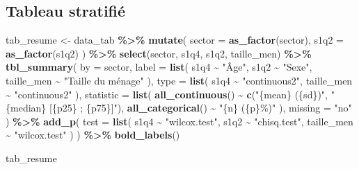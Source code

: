 \documentclass[
]{article}
\newenvironment{Shaded}{\begin{snugshade}}{\end{snugshade}}
\newcommand{\AttributeTok}[1]{\textcolor[rgb]{0.13,0.29,0.53}{#1}}
\newcommand{\FunctionTok}[1]{\textcolor[rgb]{0.13,0.29,0.53}{\textbf{#1}}}
\newcommand{\NormalTok}[1]{#1}
\newcommand{\OtherTok}[1]{\textcolor[rgb]{0.56,0.35,0.01}{#1}}
\newcommand{\SpecialCharTok}[1]{\textcolor[rgb]{0.81,0.36,0.00}{\textbf{#1}}}
\newcommand{\StringTok}[1]{\textcolor[rgb]{0.31,0.60,0.02}{#1}}
\begin{document}
\subsection{Tableau stratifié}\label{tableau-stratifiuxe9}

\begin{Shaded}
\begin{Highlighting}[]
\NormalTok{tab\_resume }\OtherTok{\textless{}{-}}\NormalTok{ data\_tab }\SpecialCharTok{\%\textgreater{}\%}
  \FunctionTok{mutate}\NormalTok{(}
    \AttributeTok{sector =} \FunctionTok{as\_factor}\NormalTok{(sector),}
    \AttributeTok{s1q2 =} \FunctionTok{as\_factor}\NormalTok{(s1q2)}
\NormalTok{  ) }\SpecialCharTok{\%\textgreater{}\%}
  \FunctionTok{select}\NormalTok{(sector, s1q4, s1q2, taille\_men) }\SpecialCharTok{\%\textgreater{}\%}
  \FunctionTok{tbl\_summary}\NormalTok{(}
    \AttributeTok{by =}\NormalTok{ sector,}
    \AttributeTok{label =} \FunctionTok{list}\NormalTok{(}
\NormalTok{      s1q4 }\SpecialCharTok{\textasciitilde{}} \StringTok{"Âge"}\NormalTok{,}
\NormalTok{      s1q2 }\SpecialCharTok{\textasciitilde{}} \StringTok{"Sexe"}\NormalTok{,}
\NormalTok{      taille\_men }\SpecialCharTok{\textasciitilde{}} \StringTok{"Taille du ménage"}
\NormalTok{    ),}
    \AttributeTok{type =} \FunctionTok{list}\NormalTok{(}
\NormalTok{      s1q4 }\SpecialCharTok{\textasciitilde{}} \StringTok{"continuous2"}\NormalTok{,}
\NormalTok{      taille\_men }\SpecialCharTok{\textasciitilde{}} \StringTok{"continuous2"}
\NormalTok{    ),}
    \AttributeTok{statistic =} \FunctionTok{list}\NormalTok{(}
      \FunctionTok{all\_continuous}\NormalTok{() }\SpecialCharTok{\textasciitilde{}} \FunctionTok{c}\NormalTok{(}\StringTok{"\{mean\} (\{sd\})"}\NormalTok{, }\StringTok{"\{median\} [\{p25\} ; \{p75\}]"}\NormalTok{),}
      \FunctionTok{all\_categorical}\NormalTok{() }\SpecialCharTok{\textasciitilde{}} \StringTok{"\{n\} (\{p\}\%)"}
\NormalTok{    ),}
    \AttributeTok{missing =} \StringTok{"no"}
\NormalTok{  ) }\SpecialCharTok{\%\textgreater{}\%}
  \FunctionTok{add\_p}\NormalTok{(}
    \AttributeTok{test =} \FunctionTok{list}\NormalTok{(}
\NormalTok{      s1q4 }\SpecialCharTok{\textasciitilde{}} \StringTok{"wilcox.test"}\NormalTok{,}
\NormalTok{      s1q2 }\SpecialCharTok{\textasciitilde{}} \StringTok{"chisq.test"}\NormalTok{,}
\NormalTok{      taille\_men }\SpecialCharTok{\textasciitilde{}} \StringTok{"wilcox.test"}
\NormalTok{    )}
\NormalTok{  ) }\SpecialCharTok{\%\textgreater{}\%}
  \FunctionTok{bold\_labels}\NormalTok{()}

\NormalTok{tab\_resume}
\end{Highlighting}
\end{Shaded}
\end{document}
